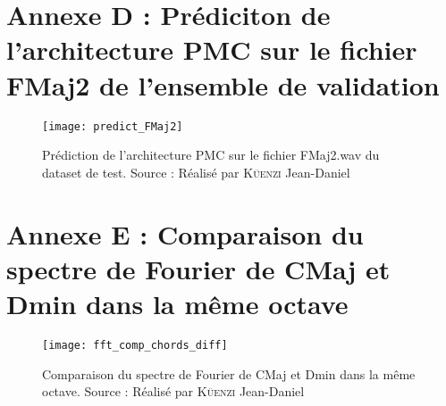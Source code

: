 \begin{appendices}
\chapter{Annexe D : Prédiciton de l'architecture PMC sur le fichier FMaj2 de l'ensemble de validation}
\label{app:4}

\begin{figure}[H]
	\centering
	\texttt{[image: predict\_FMaj2]}
	\caption[]{Prédiction de l'architecture PMC sur le fichier FMaj2.wav du dataset de test. Source : Réalisé par \textsc{Küenzi} Jean-Daniel}
	\label{fig:predict_FMaj2}
\end{figure}

\chapter{Annexe E : Comparaison du spectre de Fourier de C\sh Maj et Dmin dans la même octave}
\label{app:5}

\begin{figure}[H]
	\centering
	\texttt{[image: fft\_comp\_chords\_diff]}
	\caption[]{Comparaison du spectre de Fourier de C\sh Maj et Dmin dans la même octave. Source : Réalisé par \textsc{Küenzi} Jean-Daniel}
	\label{fig:fft_comp_chords_diff}
\end{figure}

\stopcontents[annexes]
\resumecontents[default]
\end{appendices}